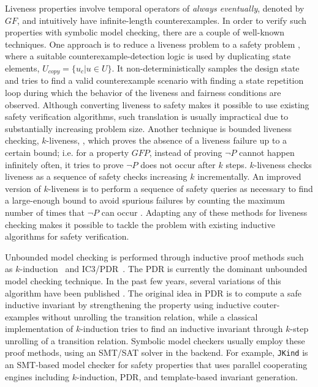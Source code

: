 Liveness properties involve temporal operators of \emph{always eventually}, denoted by $GF$, and intuitively have infinite-length counterexamples. In order to verify such properties with symbolic model checking, there are a couple of well-known techniques. One approach is to reduce a liveness problem to a safety problem \cite{Schuppan:2006}, where a suitable counterexample-detection logic is used by duplicating state elements,
 $U_{copy} = \{ u_c | u \in U \}$. It non-deterministically
samples the design state and tries to find a valid counterexample
scenario with finding a state repetition
loop during which the behavior of the liveness and fairness
conditions are observed. 
Although converting liveness to safety makes it possible to use existing safety
verification algorithms, such translation is usually impractical due to substantially increasing problem size. Another technique is bounded liveness checking, $k$-liveness, \cite{Schuppan:2006}, which proves the absence of a liveness failure up to a certain bound;
i.e. for a property $GF P$, instead of proving $\neg P$ cannot happen infinitely often, it tries to prove $\neg P$ does not occur after $k$ steps. $k$-liveness checks liveness as a sequence of safety checks increasing $k$ incrementally.
An improved version of $k$-liveness is to perform a sequence of
safety queries as necessary to find a large-enough bound to
avoid spurious failures by counting the maximum number of times that $\neg P$ can occur \cite{claessen2012liveness}. Adapting any of these methods for liveness checking makes it possible to tackle the problem with existing inductive algorithms for safety verification.




Unbounded model checking is performed through inductive proof methods such as $k$-induction~\cite{SheeranSS00} and IC3/PDR~\cite{Een2011:PDR}.
The PDR is currently the dominant unbounded model checking technique. In the past few years, several variations of this algorithm have been published \cite{hoder2012generalized, vizel2014interpolating, jovanovic2016property, gurfinkelk}.
The original idea in PDR is to compute  a
safe  inductive  invariant by strengthening the property using inductive couter-examples without unrolling the transition relation, while a classical implementation of
$k$-induction tries to find an inductive invariant through
$k$-step unrolling of a transition relation. Symbolic model checkers usually employ these proof methods, using an SMT/SAT solver in the backend. For example, \texttt{JKind} \cite{jkind} is an SMT-based model checker for safety properties that uses parallel cooperating engines including $k$-induction, PDR, and template-based invariant generation.

